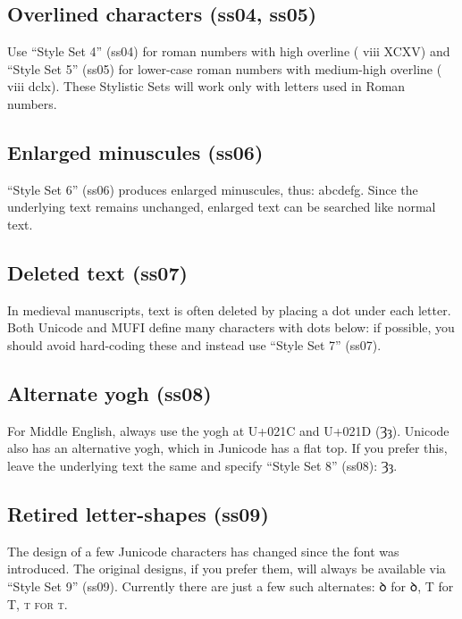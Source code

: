 \documentclass[12pt,a4paper,openany]{book}
\begin{document}
\subsection*{Overlined characters (ss04, ss05)}

Use “Style Set 4” (ss04) for roman numbers with high overline
({ viii XCXV}) and “Style Set 5”
(ss05) for lower-case roman numbers with medium-high overline
({ viii dclx}). These Stylistic
Sets will work only with letters used in Roman numbers.

\subsection*{Enlarged minuscules (ss06)}

“Style Set 6” (ss06) produces enlarged minuscules, thus:
{ abcdefg.} Since the underlying
text remains unchanged, enlarged text can be searched like normal
text.

\subsection*{Deleted text (ss07)}

In medieval manuscripts, text is often deleted by placing a dot under each
letter. Both Unicode and MUFI define many characters with dots below:
{ if possible, you should avoid
hard-coding these and instead use} “Style Set 7” (ss07).

\subsection*{Alternate yogh (ss08)}

For Middle English, always use the yogh at U+021C and U+021D (Ȝȝ).
Unicode also has an alternative yogh, which in Junicode has a
flat top. If you prefer this, leave the underlying text the same and
specify “Style Set 8” (ss08):
{ Ȝȝ}.


\subsection*{Retired letter-shapes (ss09)}

The design of a few Junicode characters has changed since the font was
introduced. The original designs, if you prefer them, will always be
available via “Style Set 9” (ss09). Currently there are just a few
such alternates: { ꝺ} for ꝺ,
{ T} for T,
{\scshape{ t} for t}.
\end{document}
